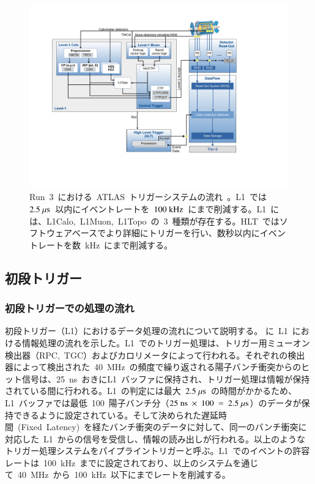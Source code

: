 \begin{figure}[H]
        \centering   
            \includegraphics[width=\textwidth,page=2]{img/pdf/tdaq-run3-schematic-withoutFTK.pdf}
        \caption[Run~3~における~ATLAS~トリガーシステムの流れ]{Run~3~における~ATLAS~トリガーシステムの流れ~\cite{URL:07}。L1~では~$2.5~\mu\rm{s}$~以内にイベントレートを~$100~\rm{kHz}$~にまで削減する。L1~には、L1Calo,~L1Muon,~L1Topo~の~3~種類が存在する。HLT~ではソフトウェアベースでより詳細にトリガーを行い、数秒以内にイベントレートを数~kHz~にまで削減する。}\label{fig:trigger}
\end{figure}

\subsection{初段トリガー}\label{subsec:l1tri}
\subsubsection{初段トリガーでの処理の流れ}
初段トリガー（L1）におけるデータ処理の流れについて説明する。
に~L1~における情報処理の流れを示した。L1~でのトリガー処理は、トリガー用ミューオン検出器（RPC,~TGC）およびカロリメータによって行われる。それぞれの検出器によって検出された~40~MHz~の頻度で繰り返される陽子バンチ衝突からのヒット信号は、25~ns~おきにL1~バッファに保持され、トリガー処理は情報が保持されている間に行われる。L1~の判定には最大~$2.5~\mu\rm{s}$~の時間がかかるため、L1~バッファでは最低~100~陽子バンチ分（$25~\rm{ns}~\times~100~=~2.5~\mu\rm{s}$）のデータが保持できるように設定されている。そして決められた遅延時間~(Fixed~Latency)~を経たバンチ衝突のデータに対して、同一のバンチ衝突に対応した~L1~からの信号を受信し、情報の読み出しが行われる。以上のようなトリガー処理システムをパイプライントリガーと呼ぶ。L1~でのイベントの許容レートは~100~kHz~までに設定されており、以上のシステムを通じて~40~MHz~から~100~kHz~以下にまでレートを削減する。

